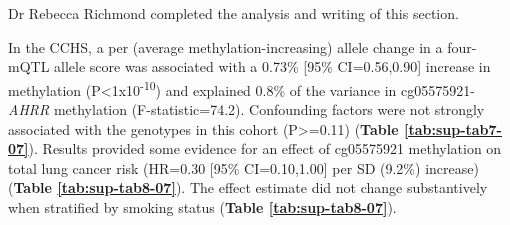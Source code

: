\documentclass[11pt,oneside]{bristolthesis}
\begin{document}
Dr Rebecca Richmond completed the analysis and writing of this section.

In the CCHS, a per (average methylation-increasing) allele change in a four-mQTL allele score was associated with a 0.73\% {[}95\% CI=0.56,0.90{]} increase in methylation (P\textless1x10\textsuperscript{-10}) and explained 0.8\% of the variance in cg05575921-\emph{AHRR} methylation (F-statistic=74.2). Confounding factors were not strongly associated with the genotypes in this cohort (P\textgreater=0.11) (\textbf{Table \ref{tab:sup-tab7-07}}). Results provided some evidence for an effect of cg05575921 methylation on total lung cancer risk (HR=0.30 {[}95\% CI=0.10,1.00{]} per SD (9.2\%) increase) (\textbf{Table \ref{tab:sup-tab8-07}}). The effect estimate did not change substantively when stratified by smoking status (\textbf{Table \ref{tab:sup-tab8-07}}). \linebreak
\end{document}
